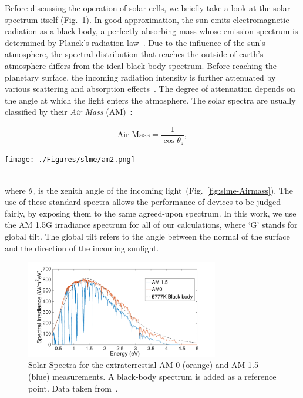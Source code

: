 \begin{refsection}
Before discussing the operation of solar cells, we briefly take a look at the solar spectrum itself (Fig.~\ref{fig:slme-solar}). In good approximation, the sun emits electromagnetic radiation as a black body, a perfectly absorbing mass whose emission spectrum is determined by Planck's radiation law~\cite{Planck1901}. Due to the influence of the sun's atmosphere, the spectral distribution that reaches the outside of earth's atmosphere differs from the ideal black-body spectrum. Before reaching the planetary surface, the incoming radiation intensity is further attenuated by various scattering and absorption effects~\cite{Bird1986}. The degree of attenuation depends on the angle at which the light enters the atmosphere. The solar spectra are usually classified by their \textit{Air Mass} (AM)~\cite{Green1981}:
\begin{minipage}{1\textwidth}
\begin{minipage}{0.4\textwidth}
\begin{equation}
\text{Air Mass} = \frac{1}{\cos \theta_z},
\end{equation}
\end{minipage}
\begin{minipage}{0.6\textwidth}
\centering
\texttt{[image: ./Figures/slme/am2.png]}
\end{minipage}
\end{minipage}
\vspace{0.2in}\\
where $\theta_z$ is the zenith angle of the incoming light~(Fig.~\ref{fig:slme-Airmass}). The use of these standard spectra allows the performance of devices to be judged fairly, by exposing them to the same agreed-upon spectrum. In this work, we use the AM 1.5G irradiance spectrum for all of our calculations, where `G' stands for global tilt. The global tilt refers to the angle between the normal of the surface and the direction of the incoming sunlight.

\begin{figure}[!htp] 
\centering
\includegraphics[width=0.75\textwidth]{./Figures/slme/SolarSpectrum.png}
\caption{\label{fig:slme-solar} Solar Spectra for the extraterrestial AM 0 (orange) and AM 1.5 (blue) measurements. A black-body spectrum is added as a reference point. Data taken from~\cite{International2012}.}
\end{figure}


\end{refsection}
